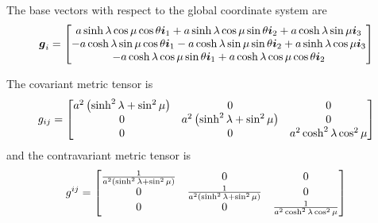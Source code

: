 The base vectors with respect to the global coordinate system are
\begin{equation}
  \vect{g}_{i}=\begin{bmatrix} 
    a\sinh\lambda\cos\mu\cos\theta\vect{i}_{1}+a\sinh\lambda\cos\mu\sin\theta\vect{i}_{2}+a\cosh\lambda\sin\mu\vect{i}_{3}\\
    -a\cosh\lambda\sin\mu\cos\theta\vect{i}_{1}-a\cosh\lambda\sin\mu\sin\theta\vect{i}_{2}+a\sinh\lambda\cos\mu\vect{i}_{3}\\    
    -a\cosh\lambda\cos\mu\sin\theta\vect{i}_{1}+a\cosh\lambda\cos\mu\cos\theta\vect{i}_{2}
  \end{bmatrix}
\end{equation}

The covariant metric tensor is
\begin{equation}
  g_{ij}=\begin{bmatrix}
    a^{2}\left( \sinh^{2}\lambda+\sin^{2}\mu \right) & 0 & 0 \\
    0 & a^{2}\left( \sinh^{2}\lambda+\sin^{2}\mu \right) & 0 \\
    0 & 0 & a^{2}\cosh^{2}\lambda\cos^{2}\mu 
  \end{bmatrix}
\end{equation}
and the contravariant metric tensor is
\begin{equation}
  g^{ij}=\begin{bmatrix}
    \frac{1}{a^{2}\left( \sinh^{2}\lambda+\sin^{2}\mu \right)}& 0 & 0 \\
    0 & \frac{1}{a^{2}\left( \sinh^{2}\lambda+\sin^{2}\mu \right)} & 0 \\
    0 & 0 & \frac{1}{a^{2}\cosh^{2}\lambda\cos^{2}\mu}
  \end{bmatrix}
\end{equation}

